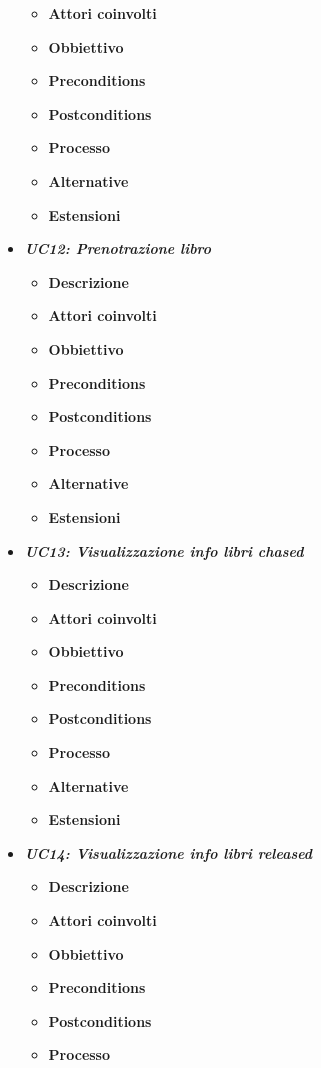 \begin{itemize}
\begin{itemize}
		\item \textbf{Attori coinvolti}
		\item \textbf{Obbiettivo}
		\item \textbf{Preconditions}
		\item \textbf{Postconditions}
		\item \textbf{Processo}
		\item \textbf{Alternative}
		\item \textbf{Estensioni}
	\end{itemize}
	\item \textbf{\textit{UC12: Prenotrazione libro}}
	\begin{itemize}
		\item \textbf{Descrizione}
		\item \textbf{Attori coinvolti}
		\item \textbf{Obbiettivo}
		\item \textbf{Preconditions}
		\item \textbf{Postconditions}
		\item \textbf{Processo}
		\item \textbf{Alternative}
		\item \textbf{Estensioni}
	\end{itemize}
	\item \textbf{\textit{UC13: Visualizzazione info libri chased}}
	\begin{itemize}
		\item \textbf{Descrizione}
		\item \textbf{Attori coinvolti}
		\item \textbf{Obbiettivo}
		\item \textbf{Preconditions}
		\item \textbf{Postconditions}
		\item \textbf{Processo}
		\item \textbf{Alternative}
		\item \textbf{Estensioni}
	\end{itemize}
	\item \textbf{\textit{UC14: Visualizzazione info libri released}}
	\begin{itemize}
		\item \textbf{Descrizione}
		\item \textbf{Attori coinvolti}
		\item \textbf{Obbiettivo}
		\item \textbf{Preconditions}
		\item \textbf{Postconditions}
		\item \textbf{Processo}

\end{itemize}
\end{itemize}
